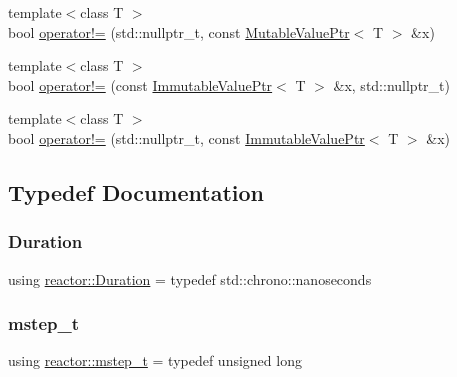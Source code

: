 \begin{DoxyCompactItemize}
\item 
{\footnotesize template$<$class T $>$ }\\bool \hyperlink{namespacereactor_a43398d2b182f1f579ce7d26b88c8ca97}{operator!=} (std\+::nullptr\+\_\+t, const \hyperlink{classreactor_1_1MutableValuePtr}{Mutable\+Value\+Ptr}$<$ T $>$ \&x)
\item 
{\footnotesize template$<$class T $>$ }\\bool \hyperlink{namespacereactor_ace39af7a63437facb0d3a59aa87e59b8}{operator!=} (const \hyperlink{classreactor_1_1ImmutableValuePtr}{Immutable\+Value\+Ptr}$<$ T $>$ \&x, std\+::nullptr\+\_\+t)
\item 
{\footnotesize template$<$class T $>$ }\\bool \hyperlink{namespacereactor_a84d02734e8877c36a53e02a6228348bf}{operator!=} (std\+::nullptr\+\_\+t, const \hyperlink{classreactor_1_1ImmutableValuePtr}{Immutable\+Value\+Ptr}$<$ T $>$ \&x)
\end{DoxyCompactItemize}


\subsection{Typedef Documentation}
\mbox{\label{namespacereactor_aa8375b807a80703545664096c5b5b779}} 
\subsubsection{\texorpdfstring{Duration}{Duration}}
{\footnotesize\ttfamily using \hyperlink{namespacereactor_aa8375b807a80703545664096c5b5b779}{reactor\+::\+Duration} = typedef std\+::chrono\+::nanoseconds}

\mbox{\label{namespacereactor_aaea1189d617982457b74127ba74a7340}} 
\subsubsection{\texorpdfstring{mstep\+\_\+t}{mstep\_t}}
{\footnotesize\ttfamily using \hyperlink{namespacereactor_aaea1189d617982457b74127ba74a7340}{reactor\+::mstep\+\_\+t} = typedef unsigned long}

\mbox{\label{namespacereactor_ad950f8d1a46612500286a4af0f167080}} 
